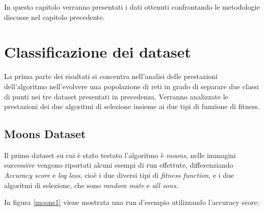\documentclass[12pt,a4paper]{report}
\begin{document}
In questo capitolo verranno presentati i dati ottenuti confrontando le  metodologie discusse nel capitolo precedente.

\section{Classificazione dei dataset}

La prima parte dei risultati si concentra nell'analisi delle prestazioni dell'algoritmo nell'evolvere una popolazione di reti in grado di separare due classi di punti nei tre dataset presentati in precedenza. Verranno analizzate le prestazioni dei due algoritmi di selezione insieme ai due tipi di funzione di fitness.

\subsection{Moons Dataset}

Il primo dataset su cui è stato testato l'algoritmo è \textit{moons}, nelle immagini successive vengono riportati alcuni esempi di run effettute, differenziando \textit{Accuracy score} e \textit{log loss}, cioè i due diversi tipi di \textit{fitness function}, e i due algoritmi di selezione, che sono \textit{random mate} e \textit{all sons}.

In figura \ref{moons1} viene mostrata una run d'esempio utilizzando l'accuracy score:
\end{document}
